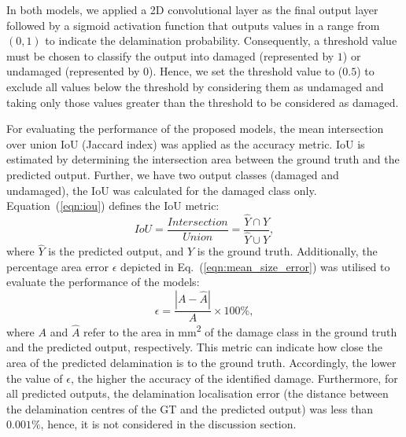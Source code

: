 \begin{sloppypar}
	In both models, we applied a 2D convolutional layer as the final output layer followed by a sigmoid activation function that outputs values in a range from \((0,1)\) to indicate the delamination probability.
	Consequently, a threshold value must be chosen to classify the output into damaged (represented by \(1\)) or undamaged (represented by \(0\)).
	Hence, we set the threshold value to (\(0.5\)) to exclude all values below the threshold by considering them as undamaged and taking only those values greater than the threshold to be considered as damaged.

	For evaluating the performance of the proposed models, the mean 
	intersection over union IoU (Jaccard index) was applied as the accuracy metric. 
	IoU is estimated by determining the intersection
	area between the ground truth and the predicted output. 
	Further, we have two output classes (damaged and undamaged), the IoU was calculated for the damaged class only. 
	Equation~(\ref{eqn:iou}) defines the IoU metric: 
	\begin{equation}
		IoU=\frac{Intersection}{Union}=\frac{\hat{Y} \cap Y}{\hat{Y} \cup Y},
		\label{eqn:iou}
	\end{equation}
	where \(\hat{Y}\) is the predicted output, and \(Y\) is the ground truth.
	Additionally, the percentage area error $\epsilon$ depicted in Eq.~(\ref{eqn:mean_size_error}) was utilised to evaluate the performance of the models:
	\begin{equation}
		\epsilon=\frac{|A-\hat{A}|}{A} \times 100\%,
		\label{eqn:mean_size_error}
	\end{equation}
	where \(A\) and \(\hat{A}\) refer to the area in mm\textsuperscript{2} of the damage class in the ground truth and the predicted output, respectively.
	This metric can indicate how close the area of the predicted delamination is to the ground truth.
	Accordingly, the lower the value of $\epsilon$, the higher the accuracy of the identified damage. 
	Furthermore, for all predicted outputs, the delamination localisation error (the distance between the delamination centres of the GT and the predicted output) was less than \(0.001\%\), hence, it is not considered in the discussion section.
\end{sloppypar}
